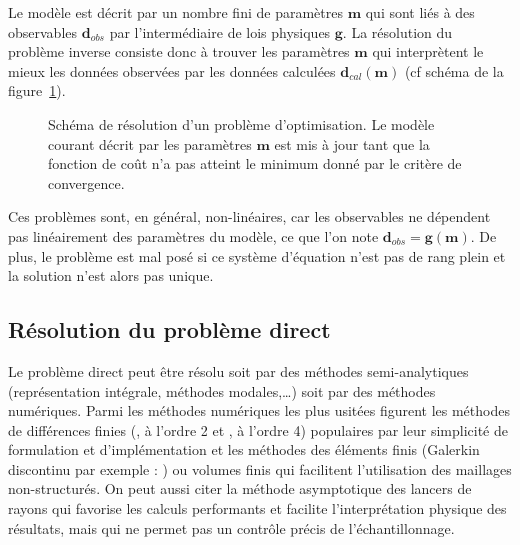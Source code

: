 Le modèle est décrit par un nombre fini de paramètres $\bm{m}$ qui sont liés à des observables $\bm{d}_{obs}$ par l'intermédiaire de lois physiques $\bm{g}$. La résolution du problème inverse consiste donc à trouver les paramètres $\bm{m}$ qui interprètent le mieux les données observées par les données calculées $\bm{d}_{cal}(\bm{m})$ (cf schéma de la figure~\ref{pb_inv}). 

\begin{figure}[!h]
	\centering
	\caption{\label{pb_inv} Schéma de résolution d'un problème d'optimisation. Le modèle courant décrit par les paramètres $\bm{m}$ est mis à jour tant que la fonction de coût n'a pas atteint le minimum donné par le critère de convergence.}
\end{figure}

Ces problèmes sont, en général, non-linéaires, car les observables ne dépendent pas linéairement des paramètres du modèle, ce que l'on note $\bm{d}_{obs}=\bm{g}(\bm{m})$. De plus, le problème est mal posé si ce système d'équation n'est pas de rang plein et la solution n'est alors pas unique.

\subsection{Résolution du problème direct}

Le problème direct peut être résolu soit par des méthodes semi-analytiques (représentation intégrale, méthodes modales,\ldots) soit par des méthodes numériques. Parmi les méthodes numériques les plus usitées figurent les méthodes de différences finies (\citealp{virieux_86}, à l'ordre 2 et \citealp{levander}, à l'ordre 4) populaires par leur simplicité de formulation et d'implémentation et les méthodes des éléments finis (Galerkin discontinu par exemple : \citealp{brossier_these}) ou volumes finis \citep{brossier_2008} qui facilitent l'utilisation des maillages non-structurés. On peut aussi citer la méthode asymptotique des lancers de rayons \citep{virieux_ray} qui favorise les calculs performants et facilite l'interprétation physique des résultats, mais qui ne permet pas un contrôle précis de l'échantillonnage.

